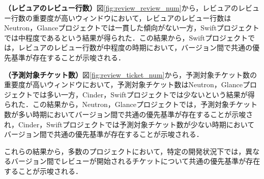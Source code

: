 \documentclass[submit]{ipsj}
\begin{document}
\textbf{（レビュアのレビュー行数）}図\ref{fig:review_review_num}から，レビュアのレビュー行数の重要度が高いウィンドウにおいて，レビュアのレビュー行数はNeutron，Glanceプロジェクトでは一貫した傾向がない一方，Swiftプロジェクトでは中程度であるという結果が得られた．この結果から，Swiftプロジェクトでは，レビュアのレビュー行数が中程度の時期において，バージョン間で共通の優先基準が存在することが示唆される．

\textbf{（予測対象チケット数）}図\ref{fig:review_ticket_num}から，予測対象チケット数の重要度が高いウィンドウにおいて，予測対象チケット数はNeutron，Glanceプロジェクトでは多い一方，Cinder，Swiftプロジェクトでは少ないという結果が得られた．この結果から，Neutron，Glanceプロジェクトでは，予測対象チケット数が多い時期においてバージョン間で共通の優先基準が存在することが示唆され，Cinder，Swiftプロジェクトでは予測対象チケット数が少ない時期においてバージョン間で共通の優先基準が存在することが示唆される．

これらの結果から，多数のプロジェクトにおいて，特定の開発状況下では，異なるバージョン間でレビューが開始されるチケットについて共通の優先基準が存在することが示唆される．


\begin{table}[t]
\caption{提案モデルのみで正例と正しく判別したチケットの予測で重要度の高い説明変数と重要度}
\label{table:review_importance_propose_only_p}
\centering
\vspace{0.5zh}
\end{table}
\end{document}
